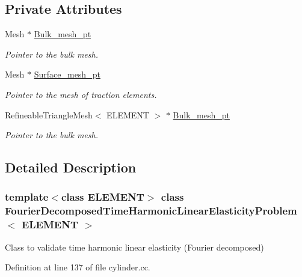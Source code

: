 \subsection*{Private Attributes}
\begin{DoxyCompactItemize}
\item 
Mesh $\ast$ \hyperlink{classFourierDecomposedTimeHarmonicLinearElasticityProblem_abc7e142ef488a0533a2544ac302f8b08}{Bulk\+\_\+mesh\+\_\+pt}
\begin{DoxyCompactList}\small\item\em Pointer to the bulk mesh. \end{DoxyCompactList}\item 
Mesh $\ast$ \hyperlink{classFourierDecomposedTimeHarmonicLinearElasticityProblem_aaf7a1b8aadd027cf6ed340e31fb53550}{Surface\+\_\+mesh\+\_\+pt}
\begin{DoxyCompactList}\small\item\em Pointer to the mesh of traction elements. \end{DoxyCompactList}\item 
Refineable\+Triangle\+Mesh$<$ E\+L\+E\+M\+E\+NT $>$ $\ast$ \hyperlink{classFourierDecomposedTimeHarmonicLinearElasticityProblem_a3de61e0bd276ce205d189e33efe3d521}{Bulk\+\_\+mesh\+\_\+pt}
\begin{DoxyCompactList}\small\item\em Pointer to the bulk mesh. \end{DoxyCompactList}\end{DoxyCompactItemize}


\subsection{Detailed Description}
\subsubsection*{template$<$class E\+L\+E\+M\+E\+NT$>$\newline
class Fourier\+Decomposed\+Time\+Harmonic\+Linear\+Elasticity\+Problem$<$ E\+L\+E\+M\+E\+N\+T $>$}

Class to validate time harmonic linear elasticity (Fourier decomposed) 

Definition at line 137 of file cylinder.\+cc.



